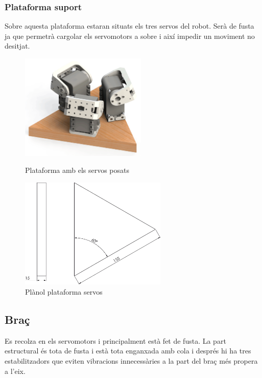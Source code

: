 \documentclass[a4paper, 12pt]{article}
\begin{document}
\subsubsection{Plataforma suport}
Sobre aquesta plataforma estaran situats els tres servos del robot. Serà de fusta ja que permetrà cargolar els servomotors a sobre i així impedir un moviment no desitjat.
\begin{figure}[h!]
\centering
\begin{minipage}[b]{0.45\linewidth}
\centering
\includegraphics[width=6cm]{./imgComp/plataforma}
\caption{Plataforma amb els servos posats}
\end{minipage}
\hfill
\begin{minipage}[b]{0.45\linewidth}
\centering
\includegraphics[width=7cm]{./sketch/plataforma}
\caption{Plànol plataforma servos}
\end{minipage}
\end{figure}


\newpage
\subsection{Braç}
Es recolza en els servomotors i principalment està fet de fusta. La part estructural és tota de fusta i està tota enganxada amb cola i després hi ha tres estabilitzadors que eviten vibracions innecessàries a la part del braç més propera a l'eix. 
\end{document}

